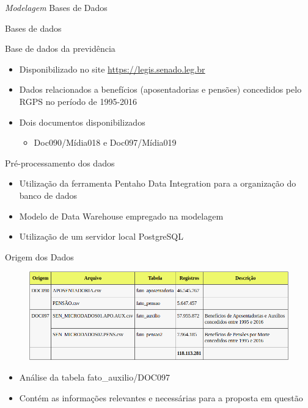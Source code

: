\begin{frame}{\textit{Modelagem}}
  Bases de Dados
\end{frame}

\begin{frame}{Bases de dados}
  \begin{block}{Base de dados da previdência}
    \begin{itemize}
      \item Disponibilizado no site \alert{\underline{\url{https://legis.senado.leg.br}}}
      \item Dados relacionados a benefícios (\alert{aposentadorias} e \alert{pensões}) concedidos pelo RGPS no período de 1995-2016
      \item Dois documentos disponibilizados
      \begin{itemize}
        \item Doc090/Mídia018 e Doc097/Mídia019
      \end{itemize}
    \end{itemize}
  \end{block}
    
  \begin{block}{Pré-processamento dos dados}
    \begin{itemize}
      \item Utilização da ferramenta \alert{Pentaho Data Integration} para a organização do banco de dados
      \item Modelo de \alert{Data Warehouse} empregado na modelagem
      \item Utilização de um servidor local PostgreSQL 
    \end{itemize}
  \end{block}
\end{frame}

\begin{frame}{Origem dos Dados}
  \begin{figure}[h]
  	\begin{center}
      \includegraphics [scale=0.48]{./Figures/table1}
  	\end{center}
  \end{figure}
  
  \begin{block}{}
    \begin{itemize}
      \item Análise da tabela \alert{fato\_auxilio/DOC097}
      \item Contém as informações relevantes e necessárias para a proposta em questão
    \end{itemize}
  \end{block}
\end{frame}

